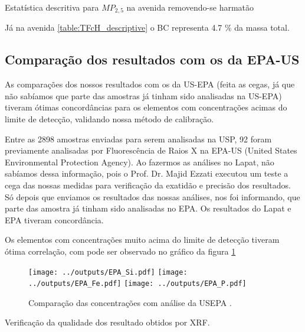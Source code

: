 \begin{table}[H]
  \centering
    
  \caption{Estatística descritiva para $MP_{2,5}$ na avenida
           removendo-se harmatão \label{table:TFsH_descriptive}}
\end{table}


Já na avenida \ref{table:TFcH_descriptive} o BC
representa 4.7 \% da massa total.

%    


\subsection{Comparação dos resultados com os da EPA-US}

As comparações dos nossos resultados com os da US-EPA (feita as cegas, já que não sabíamos que parte das amostras já tinham sido analisadas na US-EPA) tiveram ótimas concordâncias para os elementos com concentrações acimas do limite de detecção, validando nossa método de calibração.  

Entre as 2898 amostras enviadas para serem analisadas na USP, 92 foram previamente 
analisadas por Fluorescência de Raios X na EPA-US
(United States Environmental Protection Agency). 
Ao fazermos as análises no Lapat, não sabíamos
dessa informação, pois o Prof. Dr. Majid Ezzati executou um teste a cega das 
nossas medidas para verificação da exatidão e precisão dos resultados. 
Só depois que enviamos os resultados das nossas análises, nos foi informando, 
que parte das amostra já tinham sido analisadas no EPA. Os resultados do Lapat
e EPA tiveram concordância. 

Os elementos com concentrações muito acima do limite de detecção tiveram ótima
correlação, com pode ser observado no gráfico da figura \ref{fig:epa} 

\begin{figure}[H]
  \centering
    \texttt{[image: ../outputs/EPA\_Si.pdf]}
    \texttt{[image: ../outputs/EPA\_Fe.pdf]}
    \texttt{[image: ../outputs/EPA\_P.pdf]}
  \caption{Comparação das concentrações com análise da USEPA \label{fig:epa}.}
\end{figure}

Verificação da qualidade dos resultado obtidos por XRF.
